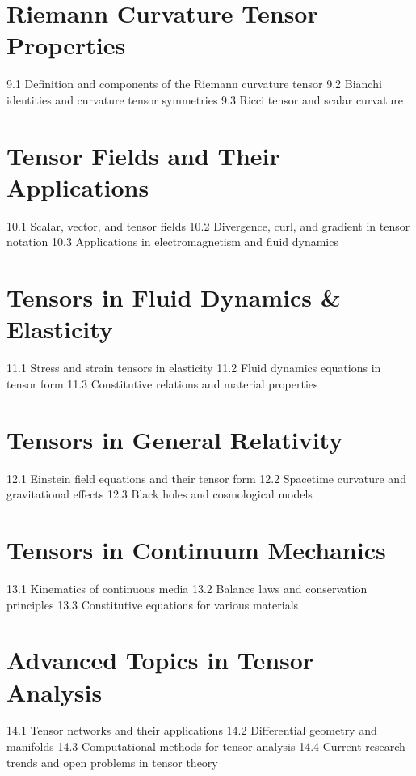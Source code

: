 \section{Riemann Curvature Tensor Properties}
9.1 Definition and components of the Riemann curvature tensor
9.2 Bianchi identities and curvature tensor symmetries
9.3 Ricci tensor and scalar curvature
\section{Tensor Fields and Their Applications}
10.1 Scalar, vector, and tensor fields
10.2 Divergence, curl, and gradient in tensor notation
10.3 Applications in electromagnetism and fluid dynamics
\section{Tensors in Fluid Dynamics \& Elasticity}
11.1 Stress and strain tensors in elasticity
11.2 Fluid dynamics equations in tensor form
11.3 Constitutive relations and material properties
\section{Tensors in General Relativity}
12.1 Einstein field equations and their tensor form
12.2 Spacetime curvature and gravitational effects
12.3 Black holes and cosmological models
\section{Tensors in Continuum Mechanics}
13.1 Kinematics of continuous media
13.2 Balance laws and conservation principles
13.3 Constitutive equations for various materials
\section{Advanced Topics in Tensor Analysis}
14.1 Tensor networks and their applications
14.2 Differential geometry and manifolds
14.3 Computational methods for tensor analysis
14.4 Current research trends and open problems in tensor theory
